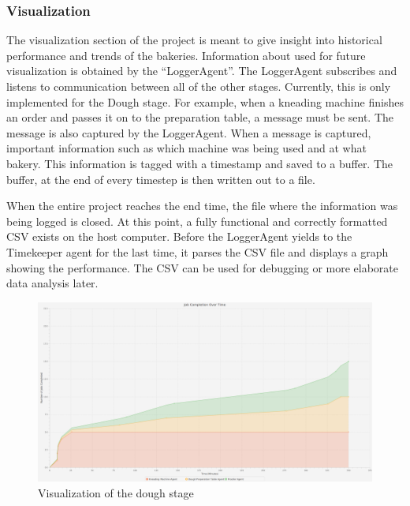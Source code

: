 \documentclass[paper=a4, fontsize=11pt]{scrartcl}
\begin{document}
	\subsubsection*{Visualization}

    The visualization section of the project is meant to give insight into
    historical performance and trends of the bakeries. Information about used
    for future visualization is obtained by the ``LoggerAgent''. The LoggerAgent
    subscribes and listens to communication between all of the other stages.
    Currently, this is only implemented for the Dough stage. For example, when
    a kneading machine finishes an order and passes it on to the preparation
    table, a message must be sent. The message is also captured by the LoggerAgent.
    When a message is captured, important information such as which machine
    was being used and at what bakery. This information is tagged with a timestamp
    and saved to a buffer. The buffer, at the end of every timestep is then
    written out to a file.

    When the entire project reaches the end time, the file where the information
    was being logged is closed. At this point, a fully functional and correctly
    formatted CSV exists on the host computer. Before the LoggerAgent yields
    to the Timekeeper agent for the last time, it parses the CSV file and
    displays a graph showing the performance. The CSV can be used for debugging
    or more elaborate data analysis later.
    
    \begin{figure}[h!]
    	\begin{center}
    		\includegraphics[scale=0.25]{images/visualization.png}
    		\caption{Visualization of the dough stage}
    	\end{center}
    \end{figure}



		{}
		
\end{document}
